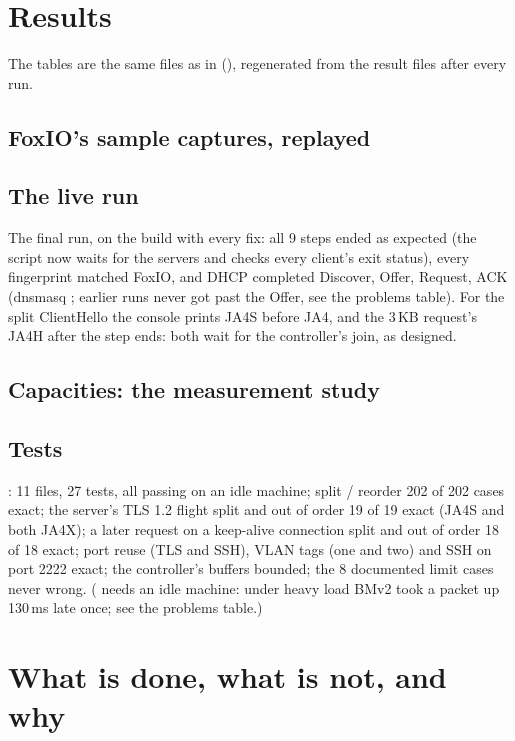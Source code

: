 \section{Results}
\label{sec:results}

The tables are the same files as in  (), regenerated from the result
files after every run.

\subsection{FoxIO's sample captures, replayed}


\subsection{The live run}
The final run, on the build with every fix: all 9 steps ended as expected (the script now waits for the servers
and checks every client's exit status), every fingerprint matched FoxIO, and DHCP completed Discover, Offer,
Request, ACK (dnsmasq ; earlier runs never got past the Offer, see the problems table). For the split
ClientHello the console prints JA4S before JA4, and the 3\,KB request's JA4H after the step ends: both wait for the
controller's join, as designed.


\subsection{Capacities: the measurement study}


\subsection{Tests}
: 11 files, 27 tests, all passing on an idle machine; split / reorder 202 of 202 cases exact; the server's TLS 1.2
flight split and out of order 19 of 19 exact (JA4S and both JA4X); a later request on a keep-alive connection split
and out of order 18 of 18 exact; port reuse (TLS and SSH), VLAN tags (one and two) and SSH on port 2222 exact; the
controller's buffers bounded; the 8
documented limit cases never wrong. ( needs an idle machine: under heavy load BMv2 took a
packet up 130\,ms late once; see the problems table.)

\section{What is done, what is not, and why}
\label{sec:coverage}


